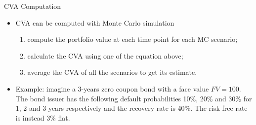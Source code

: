 \documentclass{beamer}
\begin{document}
\begin{frame}{CVA Computation}
  \begin{itemize}
  \item CVA can be computed with Monte Carlo simulation
    \begin{enumerate}
    \item compute the portfolio value at each time point for each MC scenario;
    \item calculate the CVA using one of the equation above;
    \item average the CVA of all the scenarios to get its estimate.
    \end{enumerate}
  \item Example: imagine a 3-years zero coupon bond with a face value $FV = 100$. The bond issuer has the following default probabilities 10\%, 20\% and 30\% for 1, 2 and 3 years respectively and the recovery rate is 40\%.  The risk free rate is instead 3\% flat.
  \end{itemize}
\end{frame}
\end{document}
